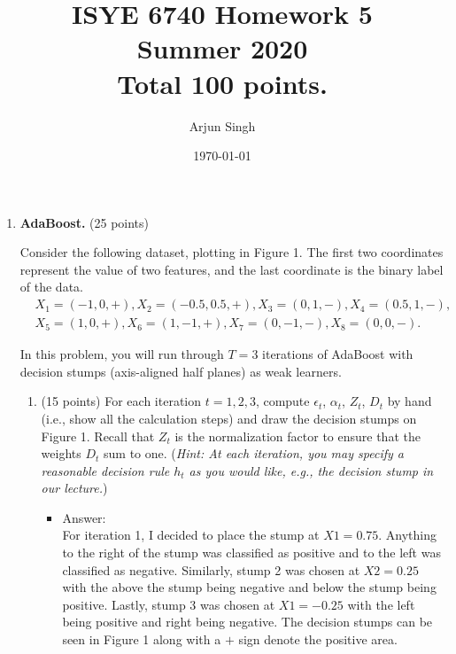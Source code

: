 \documentclass[twoside,12pt]{article}
\begin{document}
\title{ISYE 6740 Homework 5\\ 
Summer 2020\\
\small Total 100 points.}
\author{Arjun Singh}
\date{\today}
\maketitle


\begin{enumerate}


\item  {\bf AdaBoost.} (25 points)

Consider the following dataset, plotting in Figure 1. The first two coordinates represent the value of two features, and the last coordinate is the binary label of the data.
\begin{equation*}
\begin{split}
&X_1 = (-1, 0, +), X_2 = (-0.5, 0.5, +), X_3 = (0, 1, -), X_4 = (0.5, 1, -), \\
&X_5 = (1, 0, +), X_6 = (1, -1, +), X_7 = (0, -1, -), X_8 = (0, 0, -).
\end{split}
\end{equation*}

In this problem, you will run through $T = 3$ iterations of AdaBoost with decision stumps (axis-aligned half planes) as weak learners.

\begin{enumerate}
\item (15 points) For each iteration $t = 1, 2, 3$, compute $\epsilon_t$, $\alpha_t$, $Z_t$, $D_t$ by hand (i.e., show all the calculation steps) and draw the decision stumps on Figure 1. Recall that $Z_t$ is the normalization factor to ensure that the weights $D_t$ sum to one. ({\it Hint: At each iteration, you may specify a reasonable decision rule $h_t$ as you would like, e.g., the decision stump in our lecture.})
\begin{itemize}
\item Answer:\\

For iteration 1, I decided to place the stump at $X1 = 0.75$. Anything to the right of the stump was classified as positive and to the left was classified as negative. Similarly, stump 2 was chosen at $X2 = 0.25$ with the above the stump being negative and below the stump being positive. Lastly, stump 3 was chosen at $X1 = -0.25$ with the left being positive and right being negative. The decision stumps can be seen in Figure 1 along with a $+$ sign denote the positive area.\\


\end{itemize}
\end{enumerate}
\end{enumerate}
\end{document}
